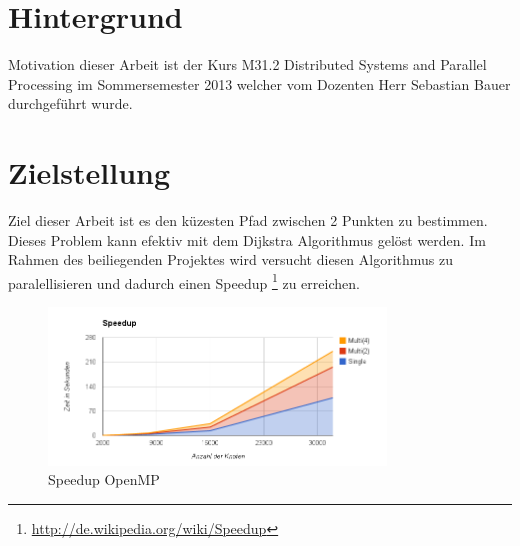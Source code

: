 \section{Hintergrund}
Motivation dieser Arbeit ist der Kurs \glqq{}M31.2 Distributed Systems and Parallel Processing\grqq{} im Sommersemester 2013 welcher vom Dozenten Herr Sebastian Bauer durchgeführt wurde. 
\section{Zielstellung}
Ziel dieser Arbeit ist es den küzesten Pfad zwischen 2 Punkten zu bestimmen. Dieses Problem kann efektiv mit dem Dijkstra Algorithmus gelöst werden. Im Rahmen des beiliegenden Projektes wird versucht diesen Algorithmus zu paralellisieren und dadurch einen Speedup \footnote{\url{http://de.wikipedia.org/wiki/Speedup}} zu erreichen.


\begin{figure}
  \centering
  \includegraphics[width=0.8\textwidth]{./daten/speedup_openmp.png}
  \caption{Speedup OpenMP}
  \label{speedup_openmp}
\end{figure}